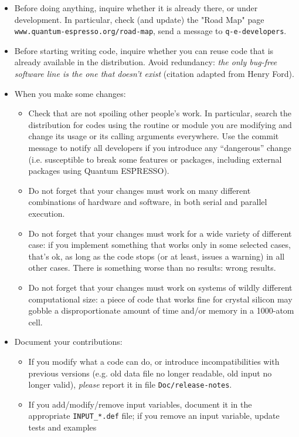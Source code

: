 \documentclass[12pt,a4paper]{article}
\def\qe{{\sc Quantum ESPRESSO}}
\begin{document}
\begin{itemize}
\item Before doing anything, inquire whether it is already there,
or under development. In particular, check (and update) the "Road Map"
page \texttt{www.quantum-espresso.org/road-map}, send a message to
\texttt{q-e-developers}.
\item Before starting writing code, inquire whether you can reuse
code that is already available in the distribution. Avoid redundancy:
{\em the only bug-free software line is the one that doesn't exist}
(citation adapted from Henry Ford).
\item When you make some changes:
\begin{itemize}
\item Check that are not spoiling other people's work. In particular,
search the distribution for codes using the routine or module you are
modifying and change its usage or its calling arguments everywhere.
Use the commit message to notify all developers if you introduce any
``dangerous'' change (i.e. susceptible to break some features or
packages, including external packages using \qe).
\item Do not forget that your changes must work on many different
combinations of hardware and software, in both serial and parallel execution.
\item Do not forget that your changes must work for a wide variety of
different case: if you implement something that works only in some
selected cases, that's ok, as long as the code stops (or at least,
issues a warning) in all other cases. There is something worse than
no results: wrong results.
\item Do not forget that your changes must work on systems of wildly
different computational size: a piece of code that works fine for
crystal silicon may gobble a disproportionate amount of time and/or
memory in a 1000-atom cell.
\end{itemize}
\item Document your contributions:
\begin{itemize}
\item If you modify what a code can do, or introduce
incompatibilities with previous versions (e.g. old data file
no longer readable, old input no longer valid), {\em please}
report it in file \texttt{Doc/release-notes}.
\item If you add/modify/remove input variables, document
it in the appropriate
\texttt{INPUT\_*.def} file; if
you remove an input variable, update tests and examples

\end{itemize}
\end{itemize}
\end{document}
